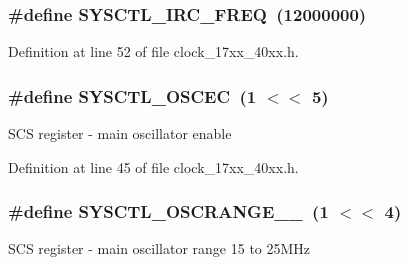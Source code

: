 \subsubsection[{\texorpdfstring{S\+Y\+S\+C\+T\+L\+\_\+\+I\+R\+C\+\_\+\+F\+R\+EQ}{SYSCTL_IRC_FREQ}}]{\setlength{\rightskip}{0pt plus 5cm}\#define S\+Y\+S\+C\+T\+L\+\_\+\+I\+R\+C\+\_\+\+F\+R\+EQ~(12000000)}\hypertarget{group__CLOCK__17XX__40XX_gadec816f1cc26d1b3c4a954d5e791e9c0}{}\label{group__CLOCK__17XX__40XX_gadec816f1cc26d1b3c4a954d5e791e9c0}


Definition at line 52 of file clock\+\_\+17xx\+\_\+40xx.\+h.

\subsubsection[{\texorpdfstring{S\+Y\+S\+C\+T\+L\+\_\+\+O\+S\+C\+EC}{SYSCTL_OSCEC}}]{\setlength{\rightskip}{0pt plus 5cm}\#define S\+Y\+S\+C\+T\+L\+\_\+\+O\+S\+C\+EC~(1 $<$$<$ 5)}\hypertarget{group__CLOCK__17XX__40XX_ga590cc793271161c9b49e27345956b527}{}\label{group__CLOCK__17XX__40XX_ga590cc793271161c9b49e27345956b527}
S\+CS register -\/ main oscillator enable 

Definition at line 45 of file clock\+\_\+17xx\+\_\+40xx.\+h.

\subsubsection[{\texorpdfstring{S\+Y\+S\+C\+T\+L\+\_\+\+O\+S\+C\+R\+A\+N\+G\+E\+\_\+15\+\_\+25}{SYSCTL_OSCRANGE_15_25}}]{\setlength{\rightskip}{0pt plus 5cm}\#define S\+Y\+S\+C\+T\+L\+\_\+\+O\+S\+C\+R\+A\+N\+G\+E\+\_\+\_~(1 $<$$<$ 4)}\hypertarget{group__CLOCK__17XX__40XX_gaf04369ab801acde194d9ffa65437364b}{}\label{group__CLOCK__17XX__40XX_gaf04369ab801acde194d9ffa65437364b}
S\+CS register -\/ main oscillator range 15 to 25\+M\+Hz 

